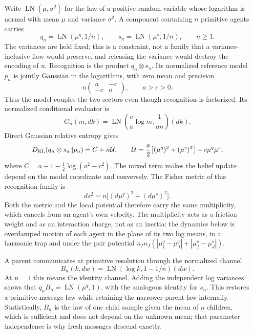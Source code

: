 Write $\operatorname{LN}(\mu,\sigma^2)$ for the law of a positive random variable whose logarithm is normal with mean $\mu$ and variance $\sigma^2$. A component containing $n$ primitive agents carries
\begin{equation}
q_n=\operatorname{LN}(\mu^q,1/n),\qquad
s_n=\operatorname{LN}(\mu^s,1/n),\qquad n\geq1.
\end{equation}
The variances are held fixed; this is a constraint, not a family that a variance-inclusive flow would preserve, and releasing the variance would destroy the encoding of $n$. Recognition is the product $q_n\otimes s_n$. Its normalized reference model $p_n$ is jointly Gaussian in the logarithms, with zero mean and precision
\begin{equation}
n\begin{pmatrix}a&-c\\-c&a\end{pmatrix},\qquad a>c>0.
\end{equation}
Thus the model couples the two sectors even though recognition is factorized. Its normalized conditional evaluator is
\begin{equation}
G_n(m,dk)=\operatorname{LN}\left(\frac ca\log m,\frac1{an}\right)(dk).
\end{equation}
Direct Gaussian relative entropy gives
\begin{equation}
D_{\mathrm{KL}}(q_n\otimes s_n\Vert p_n)=C+n\mathcal U,\qquad
\mathcal U=\frac a2\bigl[(\mu^q)^2+(\mu^s)^2\bigr]-c\mu^q\mu^s,
\end{equation}
where $C=a-1-\tfrac12\log(a^2-c^2)$. The mixed term makes the belief update depend on the model coordinate and conversely. The Fisher metric of this recognition family is
\begin{equation}
ds^2=n\bigl[(d\mu^q)^2+(d\mu^s)^2\bigr].
\end{equation}
Both the metric and the local potential therefore carry the same multiplicity, which cancels from an agent's own velocity. The multiplicity acts as a friction weight and as an interaction charge, not as an inertia: the dynamics below is overdamped motion of each agent in the plane of its two log means, in a harmonic trap and under the pair potential $n_In_J(|\mu_I^q-\mu_J^q|+|\mu_I^s-\mu_J^s|)$.

A parent communicates at primitive resolution through the normalized channel
\begin{equation}
B_n(k,dw)=\operatorname{LN}(\log k,1-1/n)(dw).
\end{equation}
At $n=1$ this means the identity channel. Adding the independent log variances shows that $q_nB_n=\operatorname{LN}(\mu^q,1)$, with the analogous identity for $s_n$. This restores a primitive message law while retaining the narrower parent law internally. Statistically, $B_n$ is the law of one child sample given the mean of $n$ children, which is sufficient and does not depend on the unknown mean; that parameter independence is why fresh messages descend exactly.

